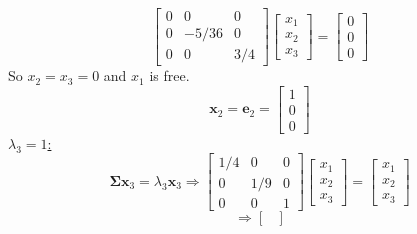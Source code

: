 \begin{enumerate}[label=(\alph*)]
\[                \begin{bmatrix}
                    0 & 0 & 0\\
                    0 & -5/36 & 0\\
                    0 & 0 & 3/4
                \end{bmatrix}
                \begin{bmatrix}
                    x_1 \\
                    x_2 \\
                    x_3
                \end{bmatrix}
                =
                \begin{bmatrix}
                    0 \\
                    0 \\
                    0
                \end{bmatrix}
            \]
            So $x_2 = x_3 = 0$ and $x_1$ is free.
            \[
                \mathbf{x}_2
                =
                \mathbf{e}_2
                =
                \begin{bmatrix}
                    1 \\
                    0 \\
                    0
                \end{bmatrix}
            \]
            \underline{$\lambda_3 = 1$:}
            \[
                \mathbf{\Sigma}\mathbf{x}_3 = \lambda_3\mathbf{x}_3
                \Rightarrow
                \begin{bmatrix}
                    1/4 & 0 & 0\\
                    0 & 1/9 & 0\\
                    0 & 0 & 1
                \end{bmatrix}
                \begin{bmatrix}
                    x_1 \\
                    x_2 \\
                    x_3
                \end{bmatrix}
                =
                \begin{bmatrix}
                    x_1 \\
                    x_2 \\
                    x_3
                \end{bmatrix}
            \]
            \[
                \Rightarrow
                \begin{bmatrix}

\end{bmatrix}\]
\end{enumerate}
